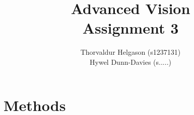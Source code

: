 \documentclass[a4paper,12pt]{article}
\title{Advanced Vision\\Assignment 3}
\author{Thorvaldur Helgason (s1237131)\\Hywel Dunn-Davies (s.....)}
\begin{document}
    
\maketitle



\section{Methods}












\end{document}
